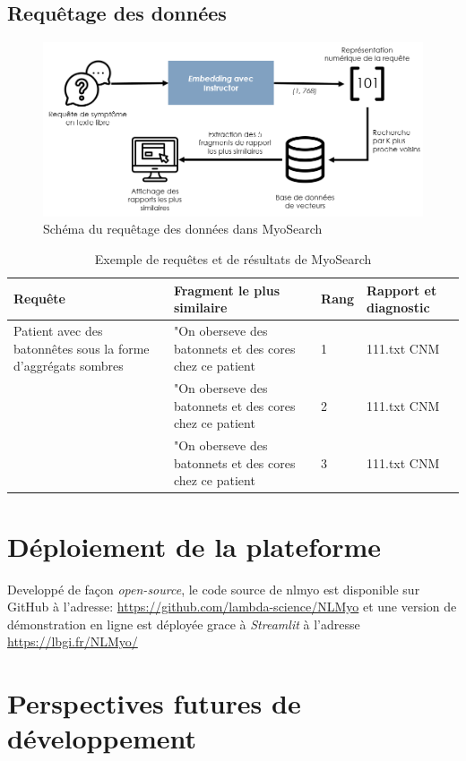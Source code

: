 \subsection{Requêtage des données}
\begin{figure}[htbp]
  \centering
  \includegraphics[width=1\textwidth]{figures/myosearch_query.png}
  \caption[Requêtage des données dans MyoSearch]{Schéma du requêtage des données dans MyoSearch}
  \label{fig:myoclassify_conf}
\end{figure}
\begin{table}[ht]
\centering
\caption{Exemple de requêtes et de résultats de MyoSearch}
\label{tab:myoclassify_metrics}
\begin{tabularx}{\textwidth}{|X|X|p{1cm}|p{2cm}|}
\toprule
\textbf{Requête} & \textbf{Fragment le plus similaire} & \textbf{Rang} & \textbf{Rapport et diagnostic} \\\hline
Patient avec des batonnêtes sous la forme d'aggrégats sombres & "On oberseve des batonnets et des cores chez ce patient & 1 & 111.txt CNM\\
 & "On oberseve des batonnets et des cores chez ce patient & 2 & 111.txt CNM \\
 & "On oberseve des batonnets et des cores chez ce patient & 3 & 111.txt CNM \\ \hline
\end{tabularx}
\end{table}
\section{Déploiement de la plateforme}
Developpé de façon \textit{open-source}, le code source de \gls{nlmyo} est disponible sur GitHub à l'adresse: \href{https://github.com/lambda-science/NLMyo}{https://github.com/lambda-science/NLMyo} et une version de démonstration en ligne est déployée grace à \textit{Streamlit} à l'adresse \href{https://lbgi.fr/NLMyo/}{https://lbgi.fr/NLMyo/}
\section{Perspectives futures de développement}